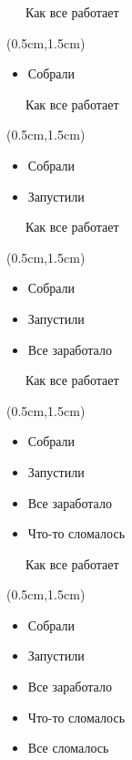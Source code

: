 \documentclass[xetex,18pt,aspectratio=43]{beamer}
\begin{document}
\begin{Large}

\begin{frame}{\ \ \ Как все работает}
\begin{textblock*}{\framewidth-0.8cm}(0.5cm,1.5cm)
\begin{itemize}
  \item Собрали
\end{itemize}
\end{textblock*}
\end{frame}

\begin{frame}{\ \ \ Как все работает}
\begin{textblock*}{\framewidth-0.8cm}(0.5cm,1.5cm)
\begin{itemize}
  \item Собрали
  \item Запустили
\end{itemize}
\end{textblock*}
\end{frame}

\begin{frame}{\ \ \ Как все работает}
\begin{textblock*}{\framewidth-0.8cm}(0.5cm,1.5cm)
\begin{itemize}
  \item Собрали
  \item Запустили
  \item Все заработало
\end{itemize}
\end{textblock*}
\end{frame}

\begin{frame}{\ \ \ Как все работает}
\begin{textblock*}{\framewidth-0.8cm}(0.5cm,1.5cm)
\begin{itemize}
  \item Собрали
  \item Запустили
  \item Все заработало
  \item Что-то сломалось
\end{itemize}
\end{textblock*}
\end{frame}

\begin{frame}{\ \ \ Как все работает}
\begin{textblock*}{\framewidth-0.8cm}(0.5cm,1.5cm)
\begin{itemize}
  \item Собрали
  \item Запустили
  \item Все заработало
  \item Что-то сломалось
  \item Все сломалось
\end{itemize}
\end{textblock*}
\end{frame}


\end{Large}
\end{document}
